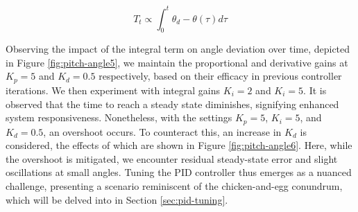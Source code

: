 \documentclass[12pt]{article}
\begin{document}
\begin{equation}
    T_t \propto \int_0^t \theta_d - \theta(\tau) d\tau
    \label{eq:pid-controller}
\end{equation}

Observing the impact of the integral term on angle deviation over time, depicted in Figure \ref{fig:pitch-angle5}, we maintain the proportional and derivative gains at \(K_p = 5\) and \(K_d = 0.5\) respectively, based on their efficacy in previous controller iterations. We then experiment with integral gains \(K_i = 2\) and \(K_i = 5\). It is observed that the time to reach a steady state diminishes, signifying enhanced system responsiveness. Nonetheless, with the settings \(K_p = 5\), \(K_i = 5\), and \(K_d=0.5\), an overshoot occurs. To counteract this, an increase in \(K_d\) is considered, the effects of which are shown in Figure \ref{fig:pitch-angle6}. Here, while the overshoot is mitigated, we encounter residual steady-state error and slight oscillations at small angles. Tuning the PID controller thus emerges as a nuanced challenge, presenting a scenario reminiscent of the chicken-and-egg conundrum, which will be delved into in Section \ref{sec:pid-tuning}.
\end{document}
